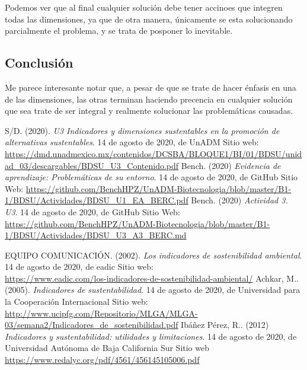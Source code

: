 \documentclass[12pt]{article}
\begin{document}
	\par Podemos ver que al final cualquier soluci\'on debe tener accinoes que integren todas las dimensiones, ya que de otra manera, \'unicamente se esta solucionando parcialmente el problema, y se trata de posponer lo inevitable.

\subsection*{Conclusi\'on}	
	\par Me parece interesante notar que, a pesar de que se trate de hacer \'enfasis en una de las dimensiones, las otras terminan haciendo precencia en cualquier soluci\'on que sea trate de ser integral y realmente solucionar las problem\'aticas causadas.




\begin{thebibliography}{X}

	 S/D. (2020). \emph{U3 \textbar{} Indicadores y dimensiones sustentables en la promoción de alternativas sustentables}. 14 de agosto de 2020, de UnADM Sitio web: \\\url{https://dmd.unadmexico.mx/contenidos/DCSBA/BLOQUE1/BI/01/BDSU/unidad_03/descargables/BDSU_U3_Contenido.pdf}
	 Bench. (2020) \emph{Evidencia de aprendizaje: Problemáticas de su entorno}. 14 de agosto de 2020, de GitHub Sitio Web: \url{https://github.com/BenchHPZ/UnADM-Biotecnologia/blob/master/B1-1/BDSU/Actividades/BDSU_U1_EA_BERC.pdf}
	 Bench. (2020) \emph{Actividad 3. U3}. 14 de agosto de 2020, de GitHub Sitio Web: \url{https://github.com/BenchHPZ/UnADM-Biotecnologia/blob/master/B1-1/BDSU/Actividades/BDSU_U3_A3_BERC.md}

	 EQUIPO COMUNICACIÓN. (2002). \emph{Los indicadores de sostenibilidad ambiental}. 14 de agosto de 2020, de eadic Sitio web: \\\url{https://www.eadic.com/los-indicadores-de-sostenibilidad-ambiental/}
	 Achkar, M.. (2005). \emph{Indicadores de sustentabilidad}. 14 de agosto de 2020, de Universidad para la Cooperación Internacional Sitio web: \url{http://www.ucipfg.com/Repositorio/MLGA/MLGA-03/semana2/Indicadores_de_sostenibilidad.pdf}
	 Ibáñez Pérez, R.. (2012) \emph{Indicadores y sustentabilidad: utilidades y limitaciones}. 14 de agosto de 2020, de Universidad Autónoma de Baja California Sur Sitio web \url{https://www.redalyc.org/pdf/4561/456145105006.pdf}
	
\end{thebibliography}
\end{document}
